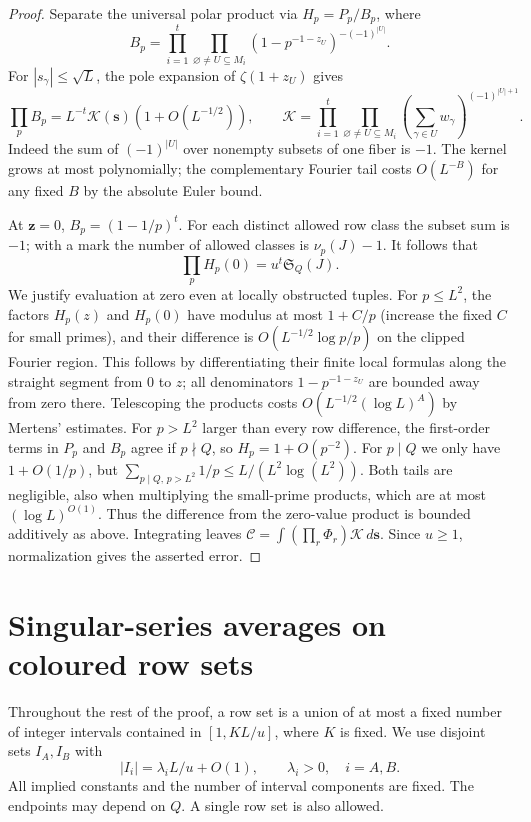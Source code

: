 \documentclass[11pt]{article}
\theoremstyle{remark}
\numberwithin{equation}{section}
\newcommand{\Sg}{\mathfrak S}
\begin{document}
\begin{proof}
Separate the universal polar product via $H_p=P_p/B_p$, where
\[
 B_p=\prod_{i=1}^t\prod_{\varnothing\ne U\subseteq M_i}
 (1-p^{-1-z_U})^{-(-1)^{|U|}}.
\]
For $|s_\gamma|\le\sqrt L$, the pole expansion of $\zeta(1+z_U)$
gives
\[
 \prod_pB_p=L^{-t}\mathcal K(\mathbf s)(1+O(L^{-1/2})),\qquad
 \mathcal K=\prod_{i=1}^t\prod_{\varnothing\ne U\subseteq M_i}
 \left(\sum_{\gamma\in U}w_\gamma\right)^{(-1)^{|U|+1}}.
\]
Indeed the sum of $(-1)^{|U|}$ over nonempty subsets of one fiber is
$-1$. The kernel grows at most polynomially; the complementary Fourier
tail costs $O(L^{-B})$ for any fixed $B$ by the absolute Euler bound.

At $\mathbf z=0$, $B_p=(1-1/p)^t$. For each distinct allowed row
class the subset sum is $-1$; with a mark the number of allowed classes
is $\nu_p(J)-1$. It follows that
\[
 \prod_p H_p(0)=u^t\Sg_Q(J).
\]
We justify evaluation at zero even at locally obstructed tuples.
For $p\le L^2$, the factors $H_p(z)$ and $H_p(0)$ have modulus at most
$1+C/p$ (increase the fixed $C$ for small primes), and their
difference is $O(L^{-1/2}\log p/p)$ on the clipped Fourier region.
This follows by differentiating their finite local formulas along
the straight segment from $0$ to $z$; all denominators
$1-p^{-1-z_U}$ are bounded away from zero there. Telescoping the products
costs $O(L^{-1/2}(\log L)^A)$ by Mertens' estimates. For $p>L^2$
larger than every row difference, the first-order terms in $P_p$ and
$B_p$ agree if $p\nmid Q$, so $H_p=1+O(p^{-2})$. For $p\mid Q$ we only have
$1+O(1/p)$, but $\sum_{p\mid Q,\,p>L^2}1/p\le L/(L^2\log(L^2))$.
Both tails are negligible, also when multiplying the small-prime
products, which are at most $(\log L)^{O(1)}$. Thus the difference
from the zero-value product is bounded additively as above.
Integrating leaves
$\mathcal C=\int (\prod_r\Phi_r)\mathcal K\,d\mathbf s$.
Since $u\ge1$, normalization gives the asserted error.
\end{proof}


\section{Singular-series averages on coloured row sets}\label{sec:average}

Throughout the rest of the proof, a row set is a union of at most a
fixed number of integer intervals contained in
$[1,KL/u]$, where $K$ is fixed. We use disjoint sets $I_A,I_B$
with
\begin{equation}\label{eq:rowcounts}
 |I_i|=\lambda_i L/u+O(1),\qquad \lambda_i>0,\quad i=A,B.
\end{equation}
All implied constants and the number of interval components are fixed.
The endpoints may depend on $Q$. A single row set is also allowed.
\end{document}
